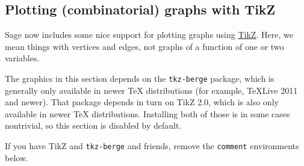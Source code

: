 \documentclass{article}
\begin{document}
\subsection{Plotting (combinatorial) graphs with TikZ}
\label{sec:plotting-graphs-with}

Sage now includes some nice support for plotting graphs using
\href{http://www.texample.net/tikz/}{TikZ}. Here, we mean things with
vertices and edges, not graphs of a function of one or two variables.

The graphics in this section depends on the \texttt{tkz-berge} package,
which is generally only available in newer \TeX{} distributions (for
example, \TeX Live 2011 and newer). That package depends in turn on
TikZ 2.0, which is also only available in newer \TeX{} distributions.
Installing both of those is in some cases nontrivial, so this section is
disabled by default.

If you have TikZ and \texttt{tkz-berge} and friends, remove the
\texttt{comment} environments below.
\end{document}
